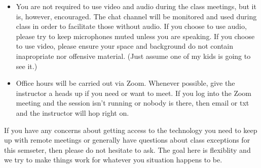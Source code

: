 \documentclass[10pt]{article}
\begin{document}
\begin{itemize}
  \item You are not required to use video and audio during the class meetings, but it is,
  however, encouraged. The chat channel will be monitored and used during class in order
  to facilitate those without audio. If you choose to use audio, please try to keep
  microphones muted unless you are speaking. If you choose to use video, please ensure
  your space and background do not contain inapropriate nor offensive material. (Just
  assume one of my kids is going to see it.)

  \item Office hours will be carried out via Zoom. Whenever possible, give the
  instructor a heads up if you need or want to meet. If you log into the Zoom meeting
  and the session isn't running or nobody is there, then email or txt and the instructor
  will hop right on.

\end{itemize}

If you have any concerns about getting access to the technology you need to keep up with
remote meetings or generally have questions about class exceptions for this semseter,
then please do not hesitate to ask. The goal here is flexiblity and we try to make
things work for whatever you situation happens to be.
\end{document}
